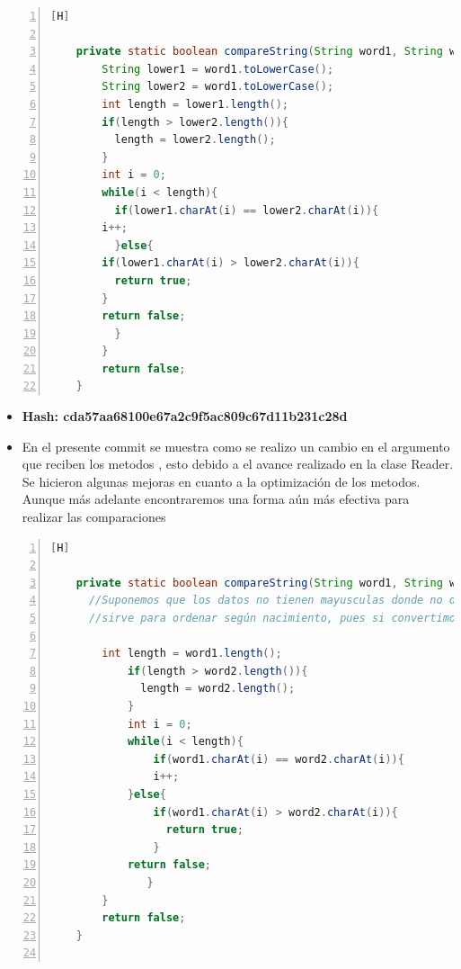   \begin{lstlisting}[language=Java, caption={Commit:  Implementando los métodos que usan el algoritmo de inserción para ordenar según nombre y apellidos. Tambien se ha creado un método privado necesario para hacer las comparaciones de los Strings. Por ultimo se corrigió algunos errores de sintaxis y pequeños cambios para mayor comprensión y eficiencia}, numbers=left, firstnumber=1][H]
    
    private static boolean compareString(String word1, String word2){
    	String lower1 = word1.toLowerCase();
    	String lower2 = word1.toLowerCase();
    	int length = lower1.length();
    	if(length > lower2.length()){
    	  length = lower2.length();	
    	}
    	int i = 0;
    	while(i < length){
    	  if(lower1.charAt(i) == lower2.charAt(i)){
		i++;
	      }else{
		if(lower1.charAt(i) > lower2.charAt(i)){
		  return true;
		}
		return false;
	      }
    	}
    	return false;
    }

  \end{lstlisting}

  \begin{itemize}
    \item \textbf{Hash: cda57aa68100e67a2c9f5ac809c67d11b231c28d}
    \item En el presente commit se muestra como se realizo un cambio en el argumento que reciben los metodos , esto debido a el avance realizado en la clase Reader. Se hicieron algunas mejoras en cuanto a la optimización de los metodos. Aunque más adelante encontraremos una forma aún más efectiva para realizar las comparaciones 
  \end{itemize}
  \begin{lstlisting}[language=Java, caption={Commit:   Se cambio el argumento de todos los métodos implementados, de arreglo de Student a arreglo de Reader.Student para posteriormente realizar las pruebas. Por último en colaboracion con las pruebas se corrigieron algunos errores de sintaxis y se eliminó el método convertion porque si el atributo DateOfBirth se compara convirtiendolo a entero, no cumple para todos los casos.}, numbers=left, firstnumber=1][H]
  	
	private static boolean compareString(String word1, String word2){
  	  //Suponemos que los datos no tienen mayusculas donde no deben. Además este método nos
  	  //sirve para ordenar según nacimiento, pues si convertimos a número, no cumple todos los casos
  	 	
		int length = word1.length();
	    	if(length > word2.length()){
	    	  length = word2.length();	
	    	}
	    	int i = 0;
	    	while(i < length){
	    		if(word1.charAt(i) == word2.charAt(i)){
				i++;
			}else{
				if(word1.charAt(i) > word2.charAt(i)){
				  return true;
				}
			return false;
		       }
		}
		return false;
	}
  
  \end{lstlisting}

